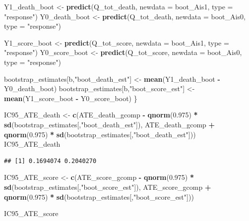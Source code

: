 \documentclass[
]{book}
\newenvironment{Shaded}{\begin{snugshade}}{\end{snugshade}}
\newcommand{\AttributeTok}[1]{\textcolor[rgb]{0.13,0.29,0.53}{#1}}
\newcommand{\FloatTok}[1]{\textcolor[rgb]{0.00,0.00,0.81}{#1}}
\newcommand{\FunctionTok}[1]{\textcolor[rgb]{0.13,0.29,0.53}{\textbf{#1}}}
\newcommand{\NormalTok}[1]{#1}
\newcommand{\OtherTok}[1]{\textcolor[rgb]{0.56,0.35,0.01}{#1}}
\newcommand{\SpecialCharTok}[1]{\textcolor[rgb]{0.81,0.36,0.00}{\textbf{#1}}}
\newcommand{\StringTok}[1]{\textcolor[rgb]{0.31,0.60,0.02}{#1}}
\begin{document}
\begin{Shaded}
\begin{Highlighting}[]
\NormalTok{  Y1\_death\_boot }\OtherTok{\textless{}{-}} \FunctionTok{predict}\NormalTok{(Q\_tot\_death, }\AttributeTok{newdata =}\NormalTok{ boot\_Ais1, }\AttributeTok{type =} \StringTok{"response"}\NormalTok{)}
\NormalTok{  Y0\_death\_boot }\OtherTok{\textless{}{-}} \FunctionTok{predict}\NormalTok{(Q\_tot\_death, }\AttributeTok{newdata =}\NormalTok{ boot\_Ais0, }\AttributeTok{type =} \StringTok{"response"}\NormalTok{)}

\NormalTok{  Y1\_score\_boot }\OtherTok{\textless{}{-}} \FunctionTok{predict}\NormalTok{(Q\_tot\_score, }\AttributeTok{newdata =}\NormalTok{ boot\_Ais1, }\AttributeTok{type =} \StringTok{"response"}\NormalTok{)}
\NormalTok{  Y0\_score\_boot }\OtherTok{\textless{}{-}} \FunctionTok{predict}\NormalTok{(Q\_tot\_score, }\AttributeTok{newdata =}\NormalTok{ boot\_Ais0, }\AttributeTok{type =} \StringTok{"response"}\NormalTok{)}

\NormalTok{  bootstrap\_estimates[b,}\StringTok{"boot\_death\_est"}\NormalTok{] }\OtherTok{\textless{}{-}} \FunctionTok{mean}\NormalTok{(Y1\_death\_boot }\SpecialCharTok{{-}}\NormalTok{ Y0\_death\_boot)}
\NormalTok{  bootstrap\_estimates[b,}\StringTok{"boot\_score\_est"}\NormalTok{] }\OtherTok{\textless{}{-}} \FunctionTok{mean}\NormalTok{(Y1\_score\_boot }\SpecialCharTok{{-}}\NormalTok{ Y0\_score\_boot)}
\NormalTok{\}}

\NormalTok{IC95\_ATE\_death }\OtherTok{\textless{}{-}} \FunctionTok{c}\NormalTok{(ATE\_death\_gcomp }\SpecialCharTok{{-}} 
                      \FunctionTok{qnorm}\NormalTok{(}\FloatTok{0.975}\NormalTok{) }\SpecialCharTok{*} \FunctionTok{sd}\NormalTok{(bootstrap\_estimates[,}\StringTok{"boot\_death\_est"}\NormalTok{]),}
\NormalTok{                    ATE\_death\_gcomp }\SpecialCharTok{+} 
                      \FunctionTok{qnorm}\NormalTok{(}\FloatTok{0.975}\NormalTok{) }\SpecialCharTok{*} \FunctionTok{sd}\NormalTok{(bootstrap\_estimates[,}\StringTok{"boot\_death\_est"}\NormalTok{]))}
\NormalTok{IC95\_ATE\_death}
\end{Highlighting}
\end{Shaded}

\begin{verbatim}
## [1] 0.1694074 0.2040270
\end{verbatim}

\begin{Shaded}
\begin{Highlighting}[]
\NormalTok{IC95\_ATE\_score }\OtherTok{\textless{}{-}} \FunctionTok{c}\NormalTok{(ATE\_score\_gcomp }\SpecialCharTok{{-}} 
                      \FunctionTok{qnorm}\NormalTok{(}\FloatTok{0.975}\NormalTok{) }\SpecialCharTok{*} \FunctionTok{sd}\NormalTok{(bootstrap\_estimates[,}\StringTok{"boot\_score\_est"}\NormalTok{]),}
\NormalTok{                    ATE\_score\_gcomp }\SpecialCharTok{+} 
                      \FunctionTok{qnorm}\NormalTok{(}\FloatTok{0.975}\NormalTok{) }\SpecialCharTok{*} \FunctionTok{sd}\NormalTok{(bootstrap\_estimates[,}\StringTok{"boot\_score\_est"}\NormalTok{]))}
                    
\NormalTok{IC95\_ATE\_score}
\end{Highlighting}
\end{Shaded}
\end{document}
